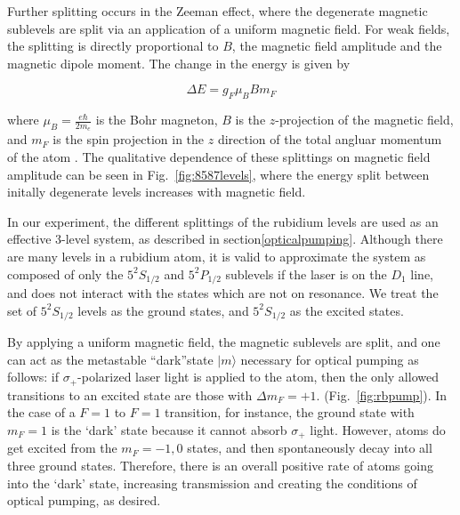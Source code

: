 Further splitting occurs in the Zeeman effect, where the degenerate
magnetic sublevels are split via an application of a uniform magnetic
field. For weak fields, the splitting is directly proportional to $B$,
the magnetic field amplitude and the magnetic dipole moment. The
change in the energy is given by

\begin{equation}
\Delta E = g_F\mu_B B m_F
\label{eqn:zeeman}
\end{equation}

where $\mu_B = \frac{e\hbar}{2m_e}$ is the Bohr magneton, $B$ is the
$z$-projection of the magnetic field, and $m_F$ is the spin projection
in the $z$ direction of the total angluar momentum of the atom
\cite{budker }. The qualitative dependence of these splittings on
magnetic field amplitude can be seen in Fig.~\ref{fig:8587levels},
where the energy split between initally degenerate levels increases
with magnetic field.

In our experiment, the different splittings of the rubidium levels are
used as an effective 3-level system, as described in
section\ref{opticalpumping}. Although there are many levels in a
rubidium atom, it is valid to approximate the system as composed of
only the $5^2S_{1/2}$ and $5^2P_{1/2}$ sublevels if the laser is on
the $D_1$ line, and does not interact with the states which are not on
resonance. We treat the set of $5^2S_{1/2}$ levels as the ground
states, and $5^2S_{1/2}$ as the excited states. 

By applying a uniform magnetic field, the magnetic sublevels are
split, and one can act as the metastable ``dark''state $|m\rangle$
necessary for optical pumping as follows: if $\sigma_+$-polarized
laser light is applied to the atom, then the only allowed transitions
to an excited state are those with $\Delta m_F = +1$.
(Fig.~\ref{fig:rbpump}). In the case of a $F = 1$ to $F = 1$
transition, for instance, the ground state with $m_F = 1$ is the
`dark' state because it cannot absorb $\sigma_+$ light. However, atoms
do get excited from the $m_F = -1, 0$ states, and then spontaneously
decay into all three ground states. Therefore, there is an overall
positive rate of atoms going into the `dark' state, increasing
transmission and creating the conditions of optical pumping, as desired. 

